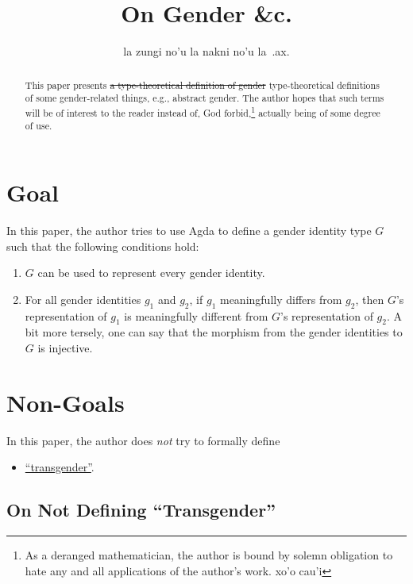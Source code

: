 \documentclass{article}
\title{On Gender \&c.}
\author{la zungi no'u la nakni no'u la\ .ax.}
\theoremstyle{remark}
\newcommand{\summaryLink}[2]{\hyperref[#1]{#2}}
\begin{document}
\maketitle{}

\begin{abstract}
\sloppypar{}
This paper presents \st{a type-theoretical definition of gender} type-theoretical definitions of some gender-related things, e.g., abstract gender.  The author hopes that such terms will be of interest to the reader instead of, God forbid,\footnote{As a deranged mathematician, the author is bound by solemn obligation to hate any and all applications of the author's work.  xo'o cau'i} actually being of some degree of use.
\end{abstract}

\section{Goal}
In this paper, the author tries to use Agda to define a gender identity type \(G\) such that the following conditions hold:

\begin{enumerate}
  \item \(G\) can be used to represent every gender identity.
  \item For all gender identities \(g_1\) and \(g_2\), if \(g_1\) meaningfully differs from \(g_2\), then \(G\)'s representation of \(g_1\) is meaningfully different from \(G\)'s representation of \(g_2\).  A bit more tersely, one can say that the morphism from the gender identities to \(G\) is injective.\label{enum:specRuleRepresentationDifference}
\end{enumerate}

\section{Non-Goals}
In this paper, the author does \emph{not} try to formally define

\begin{itemize}
  \item \summaryLink{sec:nonGoalTransgender}{``transgender''}.
\end{itemize}

\subsection{On Not Defining ``Transgender''}\label{sec:nonGoalTransgender}
\end{document}
